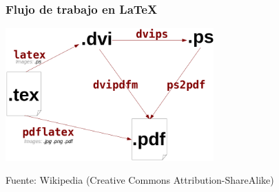 
\begin{frame}
\frametitle{Flujo de trabajo en \LaTeX}

\begin{center}
  \includegraphics[width=8cm]{figs/latex.png}
\end{center}


\begin{flushright}
{\tiny
Fuente: Wikipedia (Creative Commons Attribution-ShareAlike)
}
\end{flushright}

\end{frame}


